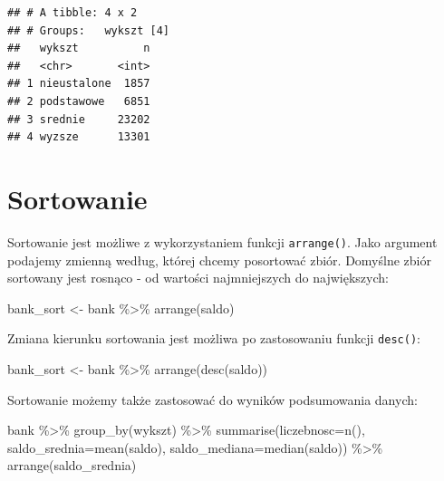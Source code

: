 \documentclass[
]{book}
\newenvironment{Shaded}{\begin{snugshade}}{\end{snugshade}}
\newcommand{\AttributeTok}[1]{\textcolor[rgb]{0.77,0.63,0.00}{#1}}
\newcommand{\FunctionTok}[1]{\textcolor[rgb]{0.00,0.00,0.00}{#1}}
\newcommand{\NormalTok}[1]{#1}
\newcommand{\OtherTok}[1]{\textcolor[rgb]{0.56,0.35,0.01}{#1}}
\newcommand{\SpecialCharTok}[1]{\textcolor[rgb]{0.00,0.00,0.00}{#1}}
\begin{document}
\begin{verbatim}
## # A tibble: 4 x 2
## # Groups:   wykszt [4]
##   wykszt          n
##   <chr>       <int>
## 1 nieustalone  1857
## 2 podstawowe   6851
## 3 srednie     23202
## 4 wyzsze      13301
\end{verbatim}

\hypertarget{sortowanie}{%
\section{Sortowanie}\label{sortowanie}}

Sortowanie jest możliwe z wykorzystaniem funkcji \texttt{arrange()}. Jako argument podajemy zmienną według, której chcemy posortować zbiór. Domyślne zbiór sortowany jest rosnąco - od wartości najmniejszych do największych:

\begin{Shaded}
\begin{Highlighting}[]
\NormalTok{bank\_sort }\OtherTok{\textless{}{-}}\NormalTok{ bank }\SpecialCharTok{\%\textgreater{}\%}
  \FunctionTok{arrange}\NormalTok{(saldo)}
\end{Highlighting}
\end{Shaded}

Zmiana kierunku sortowania jest możliwa po zastosowaniu funkcji \texttt{desc()}:

\begin{Shaded}
\begin{Highlighting}[]
\NormalTok{bank\_sort }\OtherTok{\textless{}{-}}\NormalTok{ bank }\SpecialCharTok{\%\textgreater{}\%}
  \FunctionTok{arrange}\NormalTok{(}\FunctionTok{desc}\NormalTok{(saldo))}
\end{Highlighting}
\end{Shaded}

Sortowanie możemy także zastosować do wyników podsumowania danych:

\begin{Shaded}
\begin{Highlighting}[]
\NormalTok{bank }\SpecialCharTok{\%\textgreater{}\%}
  \FunctionTok{group\_by}\NormalTok{(wykszt) }\SpecialCharTok{\%\textgreater{}\%}
  \FunctionTok{summarise}\NormalTok{(}\AttributeTok{liczebnosc=}\FunctionTok{n}\NormalTok{(),}
            \AttributeTok{saldo\_srednia=}\FunctionTok{mean}\NormalTok{(saldo),}
            \AttributeTok{saldo\_mediana=}\FunctionTok{median}\NormalTok{(saldo)) }\SpecialCharTok{\%\textgreater{}\%}
  \FunctionTok{arrange}\NormalTok{(saldo\_srednia)}
\end{Highlighting}
\end{Shaded}
\end{document}
